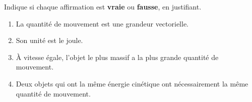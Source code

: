 \documentclass[11pt,a4paper]{article}
\begin{document}
\begin{exo}
Indique si chaque affirmation est \textbf{vraie} ou \textbf{fausse}, en justifiant.
\begin{enumerate}[label=\alph*)]
  \item La quantité de mouvement est une grandeur vectorielle.
  \item Son unité est le joule.
  \item À vitesse égale, l'objet le plus massif a la plus grande quantité de mouvement.
  \item Deux objets qui ont la même énergie cinétique ont nécessairement la même quantité de mouvement.
\end{enumerate}
\end{exo}
\end{document}

